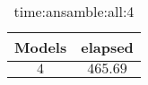 \begin{table}[!ht]
	\centering
	\begin{tabular}{|c|c|}
		\hline
		Models & elapsed \\ \hline
		$4$ & $465.69$ \\ \hline
	\end{tabular}
	\caption{time:ansamble:all:4}
	\label{tab:time:ansamble:all:4}
\end{table}
